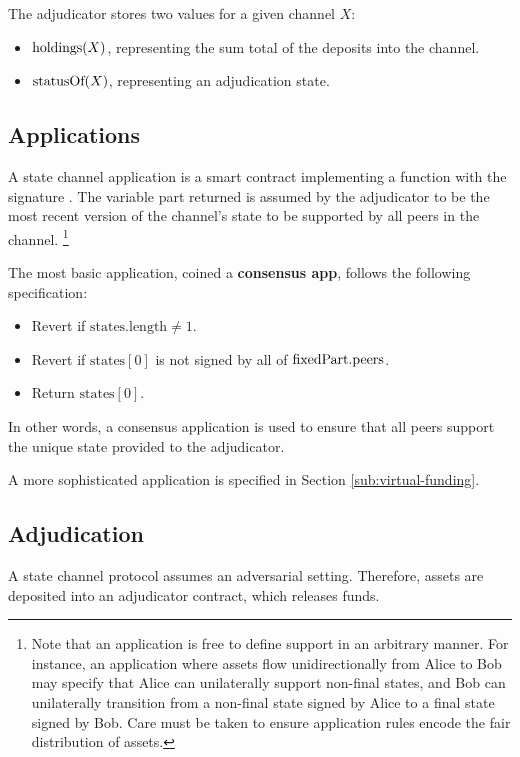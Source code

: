The adjudicator stores two values for a given channel $X$:
\begin{itemize}
  \item $\mbox{holdings}(X)$, representing the sum total of the deposits into the channel.
  \item $\mbox{statusOf}(X)$, representing an adjudication state.
\end{itemize}

\subsection{Applications}\label{sec:applications}

A state channel application is a smart contract implementing a \latestSupportedState function with the signature .
The variable part returned is assumed by the adjudicator to be the most recent version of the channel's state to be supported by all peers in the channel. \footnote{
Note that an application is free to define support in an arbitrary manner. For instance, an application where assets flow unidirectionally from Alice to Bob may specify that Alice can unilaterally support non-final states, and Bob can unilaterally transition from a non-final state signed by Alice to a final state signed by Bob. 
Care must be taken to ensure application rules encode the fair distribution of assets.
}

The most basic application, coined a \textbf{consensus app}, follows the following specification:
\begin{itemize}
  \item Revert if $\mbox{states}.\mbox{length} \neq 1$.
  \item Revert if $\mbox{states}[0]$ is not signed by all of $\mbox{fixedPart}.\mbox{peers}$.
  \item Return $\mbox{states}[0].$
\end{itemize}
In other words, a consensus application is used to ensure that all peers support the unique state provided to the adjudicator.

A more sophisticated application is specified in Section \ref{sub:virtual-funding}.

\subsection{Adjudication}
A state channel protocol assumes an adversarial setting. Therefore, assets are deposited into an adjudicator contract, which releases funds.

